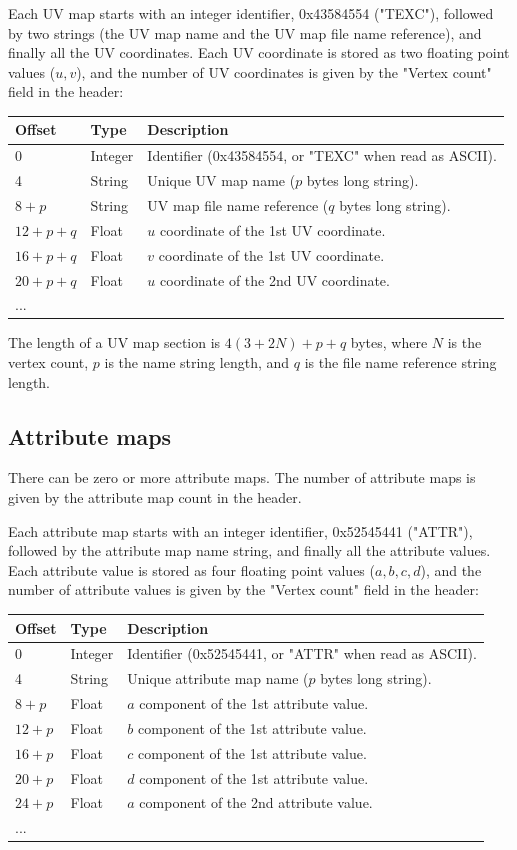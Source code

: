 Each UV map starts with an integer identifier, 0x43584554 ("TEXC"), followed
by two strings (the UV map name and the UV map file name reference), and
finally all the UV coordinates. Each UV coordinate is stored as two floating point
values ($u,v$), and the number of UV coordinates is given by the "Vertex count"
field in the header:

\begin{tabular}{|l|l|l|}\hline
\textbf{Offset} &  \textbf{Type} & \textbf{Description}\\ \hline
0 & Integer & Identifier (0x43584554, or "TEXC" when read as ASCII).\\ \hline
4 & String & Unique UV map name ($p$ bytes long string).\\ \hline
$8+p$ & String & UV map file name reference ($q$ bytes long string).\\ \hline
$12+p+q$ & Float & $u$ coordinate of the 1st UV coordinate.\\ \hline
$16+p+q$ & Float & $v$ coordinate of the 1st UV coordinate.\\ \hline
$20+p+q$ & Float & $u$ coordinate of the 2nd UV coordinate.\\ \hline
... & & \\ \hline
\end{tabular}

The length of a UV map section is $4(3+2N)+p+q$ bytes, where $N$ is the vertex
count, $p$ is the name string length, and $q$ is the file name reference string
length.

\subsection{Attribute maps}
There can be zero or more attribute maps. The number of attribute maps is given by the
attribute map count in the header.

Each attribute map starts with an integer identifier, 0x52545441 ("ATTR"), followed
by the attribute map name string, and finally all the attribute values. Each attribute
value is stored as four floating point values ($a,b,c,d$), and the number of
attribute values is given by the "Vertex count" field in the header:

\begin{tabular}{|l|l|l|}\hline
\textbf{Offset} &  \textbf{Type} & \textbf{Description}\\ \hline
0 & Integer & Identifier (0x52545441, or "ATTR" when read as ASCII).\\ \hline
4 & String & Unique attribute map name ($p$ bytes long string).\\ \hline
$8+p$ & Float & $a$ component of the 1st attribute value.\\ \hline
$12+p$ & Float & $b$ component of the 1st attribute value.\\ \hline
$16+p$ & Float & $c$ component of the 1st attribute value.\\ \hline
$20+p$ & Float & $d$ component of the 1st attribute value.\\ \hline
$24+p$ & Float & $a$ component of the 2nd attribute value.\\ \hline
... & & \\ \hline
\end{tabular}

